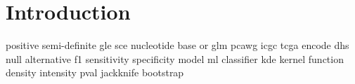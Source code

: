 \chapter{Introduction}\label{intro}

\gls{positive semi-definite}
\gls{gle} 
\gls{sce}
\gls{nucleotide}
\gls{base}
\gls{or}
\gls{glm}
\gls{pcawg}
\gls{icgc}
\gls{tcga}
\gls{encode}
\gls{dhs}
\gls{null}
\gls{alternative}
\gls{f1}
\gls{sensitivity}
\gls{specificity}
\gls{model}
\gls{ml}
\gls{classifier}
\gls{kde}
\gls{kernel function}
\gls{density}
\gls{intensity}
\gls{pval}
\gls{jackknife}
\gls{bootstrap}